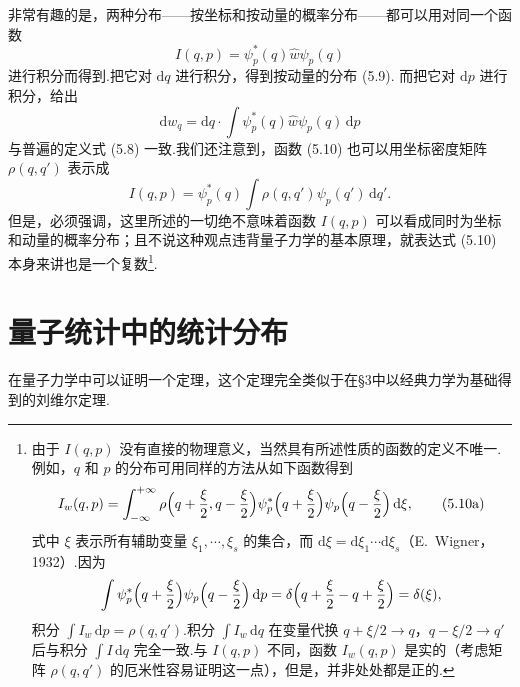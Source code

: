 非常有趣的是，两种分布——按坐标和按动量的概率分布——都可以用对同一个函数
\begin{equation}
  I(q,p)=\psi_p^{*}(q)\hat{w}\psi_p(q)
\end{equation}
进行积分而得到.把它对 $\mathrm{d}q$ 进行积分，得到按动量的分布 (5.9). 而把它对 $\mathrm{d}p$ 进行积分，给出
\begin{equation}
  \mathrm{d}w_q=\mathrm{d}q\cdot\int\psi_p^{*}(q)\hat{w}\psi_p(q)\,\mathrm{d}p
\end{equation}
与普遍的定义式 (5.8) 一致.我们还注意到，函数 (5.10) 也可以用坐标密度矩阵 $\rho(q,q')$ 表示成
\begin{equation}
  I(q,p)=\psi_p^{*}(q)\int\rho(q,q')\psi_p(q')\,\mathrm{d}q'.
\end{equation}
但是，必须强调，这里所述的一切绝不意味着函数 $I(q,p)$ 可以看成同时为坐标和动量的概率分布；且不说这种观点违背量子力学的基本原理，就表达式 (5.10) 本身来讲也是一个复数\footnote{由于 $I(q,p)$ 没有直接的物理意义，当然具有所述性质的函数的定义不唯一.例如，$q$ 和 $p$ 的分布可用同样的方法从如下函数得到
\begin{equation*}
  I_w(q,p)=\int_{-\infty}^{+\infty}\rho\Bigl(q+\frac{\xi}{2},q-\frac{\xi}{2}\Bigr)\psi_p^{*}\Bigl(q+\frac{\xi}{2}\Bigr)\psi_p\Bigl(q-\frac{\xi}{2}\Bigr)\,\mathrm{d}\xi,
  \tag{5.10a}
\end{equation*}
式中 $\xi$ 表示所有辅助变量 $\xi_1,\cdots,\xi_s$ 的集合，而 $\mathrm{d}\xi=\mathrm{d}\xi_1\cdots\mathrm{d}\xi_s$（E.~Wigner，1932）.因为
\begin{equation*}
  \int\psi_p^{*}\Bigl(q+\frac{\xi}{2}\Bigr)\psi_p\Bigl(q-\frac{\xi}{2}\Bigr)\,\mathrm{d}p
  =\delta\Bigl(q+\frac{\xi}{2}-q+\frac{\xi}{2}\Bigr)=\delta(\xi),
\end{equation*}
积分 $\int I_w\,\mathrm{d}p=\rho(q,q')$.积分 $\int I_w\,\mathrm{d}q$ 在变量代换 $q+\xi/2\to q$，$q-\xi/2\to q'$ 后与积分 $\int I\,\mathrm{d}q$ 完全一致.与 $I(q,p)$ 不同，函数 $I_w(q,p)$ 是实的（考虑矩阵 $\rho(q,q')$ 的厄米性容易证明这一点），但是，并非处处都是正的.}.

\section{量子统计中的统计分布}

在量子力学中可以证明一个定理，这个定理完全类似于在§3中以经典力学为基础得到的刘维尔定理.

